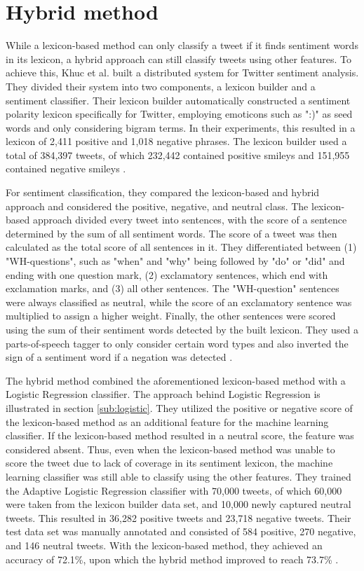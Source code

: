 \section{Hybrid method}
While a lexicon-based method can only classify a tweet if it finds sentiment words in its lexicon, a hybrid approach can still classify tweets using other features. To achieve this, Khuc et al. built a distributed system for Twitter sentiment analysis. They divided their system into two components, a lexicon builder and a sentiment classifier. Their lexicon builder automatically constructed a sentiment polarity lexicon specifically for Twitter, employing emoticons such as ":)" as seed words and only considering bigram terms. In their experiments, this resulted in a lexicon of 2,411 positive and 1,018 negative phrases. The lexicon builder used a total of 384,397 tweets, of which 232,442 contained positive smileys and 151,955 contained negative smileys \cite{khuc}.

For sentiment classification, they compared the lexicon-based and hybrid approach and considered the positive, negative, and neutral class. The lexicon-based approach divided every tweet into sentences, with the score of a sentence determined by the sum of all sentiment words. The score of a tweet was then calculated as the total score of all sentences in it. They differentiated between (1) "WH-questions", such as "when" and "why" being followed by "do" or "did" and ending with one question mark, (2) exclamatory sentences, which end with exclamation marks, and (3) all other sentences. The "WH-question" sentences were always classified as neutral, while the score of an exclamatory sentence was multiplied to assign a higher weight. Finally, the other sentences were scored using the sum of their sentiment words detected by the built lexicon. They used a parts-of-speech tagger to only consider certain word types and also inverted the sign of a sentiment word if a negation was detected \cite{khuc}.

The hybrid method combined the aforementioned lexicon-based method with a Logistic Regression classifier. The approach behind Logistic Regression is illustrated in section \ref{sub:logistic}. They utilized the positive or negative score of the lexicon-based method as an additional feature for the machine learning classifier. If the lexicon-based method resulted in a neutral score, the feature was considered absent. Thus, even when the lexicon-based method was unable to score the tweet due to lack of coverage in its sentiment lexicon, the machine learning classifier was still able to classify using the other features. They trained the Adaptive Logistic Regression classifier with 70,000 tweets, of which 60,000 were taken from the lexicon builder data set, and 10,000 newly captured neutral tweets. This resulted in 36,282 positive tweets and 23,718 negative tweets. Their test data set was manually annotated and consisted of 584 positive, 270 negative, and 146 neutral tweets. With the lexicon-based method, they achieved an accuracy of 72.1\%, upon which the hybrid method improved to reach 73.7\% \cite{khuc}.










